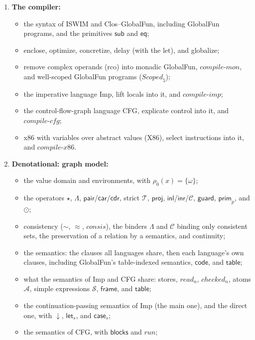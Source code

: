 \documentclass[10pt]{article}
\theoremstyle{acmplain}
\newcommand{\key}[1]{\mathsf{#1}}
\newcommand{\pass}[1]{\mathit{#1}}
\newcommand{\consis}{\mathit{consis}}
\begin{document}
\begin{enumerate}
\item \textbf{The compiler:}
  \begin{itemize}
  \item the syntax of ISWIM and Clos--GlobalFun, including GlobalFun programs,
    and the primitives $\key{sub}$ and $\key{eq}$;
  \item enclose, optimize, concretize, delay (with the let), and globalize;
  \item remove complex operands (rco) into monadic GlobalFun, $\pass{compile\text{-}mon}$,
    and well-scoped GlobalFun programs ($\mathit{Scoped}_5$);
  \item the imperative language Imp, lift locals into it, and
    $\pass{compile\text{-}imp}$;
  \item the control-flow-graph language CFG, explicate control into it, and
    $\pass{compile\text{-}cfg}$;
  \item x86 with variables over abstract values (X86), select
    instructions into it, and $\pass{compile\text{-}x86}$.
  \end{itemize}
\item \textbf{Denotational: graph model:}
  \begin{itemize}
  \item the value domain and environments, with $\rho_0(x) = \{\omega\}$;
  \item the operators $\star$, $\Lambda$, $\key{pair}$/$\key{car}$/$\key{cdr}$,
    strict $\mathcal{T}$, $\key{proj}$, $\key{inl}$/$\key{inr}$/$\mathcal{C}$,
    $\key{guard}$, $\key{prim}_p$, and $\odot$;
  \item consistency ($\sim$, $\approx$, $\consis$), the binders $\Lambda$ and
    $\mathcal{C}$ binding only consistent sets, the preservation of a relation
    by a semantics, and continuity;
  \item the semantics: the clauses all languages share, then each language's own
    clauses, including GlobalFun's table-indexed semantics, $\key{code}$, and $\key{table}$;
  \item what the semantics of Imp and CFG share: stores, $\mathit{read}_n$,
    $\mathit{checked}_n$, atoms $\mathcal{A}$, simple expressions $\mathcal{S}$,
    $\key{frame}$, and $\key{table}$;
  \item the continuation-passing semantics of Imp (the main one), and the direct
    one, with ${\downarrow}$, $\key{let}_s$, and $\key{case}_s$;
  \item the semantics of CFG, with $\key{blocks}$ and $\mathit{run}$;

\end{itemize}
\end{enumerate}
\end{document}
